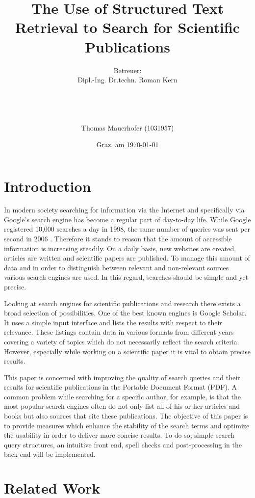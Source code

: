 \documentclass[a4paper, 12pt]{scrartcl}
\title{The Use of Structured Text Retrieval to Search for Scientific Publications}
\author{Betreuer: \\
Dipl.-Ing. Dr.techn. Roman Kern \\ \\ \\ \\ \\
Thomas Mauerhofer (1031957)}
\date{Graz, am \today{}}
\begin{document}
\maketitle
 
\newpage

\tableofcontents

\newpage

\section{Introduction}
\label{sec:Introduction}

In modern society searching for information via the Internet and specifically via Google's search engine has become a regular part of
day-to-day life. While Google registered 10,000 searches a day in 1998, the same number of queries was sent per second in 2006 \cite{Google}.
Therefore it stands to reason that the amount of accessible information is increasing steadily. On a daily basis, new websites are created,
articles are written and scientific papers are published. To manage this amount of data and in order to distinguish between relevant and non-relevant
sources various search engines are used. In this regard, searches should be simple and yet precise.

Looking at search engines for scientific publications and research there exists a broad selection of possibilities. One of the best known engines is
Google Scholar. It uses a simple input interface and lists the results with respect to their relevance. These listings contain data
in various formats from different years covering a variety of topics which do not necessarily reflect the search criteria. However, especially
while working on a scientific paper it is vital to obtain precise results.

This paper is concerned with improving the quality of search queries and their results for scientific publications in the Portable Document
Format (PDF). A common problem while searching for a specific author, for example, is that the most popular search engines often do not only list all of
his or her articles and books but also sources that cite these publications. The objective of this paper is to provide measures which enhance the stability of the search
terms and optimize the usability in order to deliver more concise results. To do so, simple search query structures, an intuitive front end, spell checks
and post-processing in the back end will be implemented.

\section{Related Work}
\end{document}

